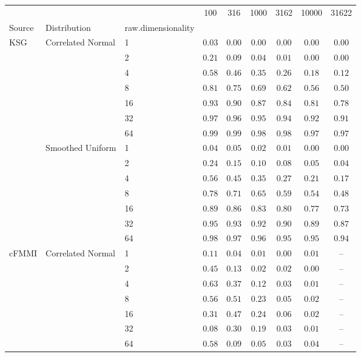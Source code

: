 \begin{tabular}{lllcccccc}
\toprule
 &  &  & 100 & 316 & 1000 & 3162 & 10000 & 31622 \\
Source & Distribution & raw.dimensionality &  &  &  &  &  &  \\
\midrule
\multirow[l]{14}{*}{KSG} & \multirow[l]{7}{*}{Correlated Normal} & 1 & $0.03$ & $0.00$ & $0.00$ & $0.00$ & $0.00$ & $0.00$ \\
 &  & 2 & $0.21$ & $0.09$ & $0.04$ & $0.01$ & $0.00$ & $0.00$ \\
 &  & 4 & $0.58$ & $0.46$ & $0.35$ & $0.26$ & $0.18$ & $0.12$ \\
 &  & 8 & $0.81$ & $0.75$ & $0.69$ & $0.62$ & $0.56$ & $0.50$ \\
 &  & 16 & $0.93$ & $0.90$ & $0.87$ & $0.84$ & $0.81$ & $0.78$ \\
 &  & 32 & $0.97$ & $0.96$ & $0.95$ & $0.94$ & $0.92$ & $0.91$ \\
 &  & 64 & $0.99$ & $0.99$ & $0.98$ & $0.98$ & $0.97$ & $0.97$ \\
\cmidrule{2-9}
 & \multirow[l]{7}{*}{Smoothed Uniform} & 1 & $0.04$ & $0.05$ & $0.02$ & $0.01$ & $0.00$ & $0.00$ \\
 &  & 2 & $0.24$ & $0.15$ & $0.10$ & $0.08$ & $0.05$ & $0.04$ \\
 &  & 4 & $0.56$ & $0.45$ & $0.35$ & $0.27$ & $0.21$ & $0.17$ \\
 &  & 8 & $0.78$ & $0.71$ & $0.65$ & $0.59$ & $0.54$ & $0.48$ \\
 &  & 16 & $0.89$ & $0.86$ & $0.83$ & $0.80$ & $0.77$ & $0.73$ \\
 &  & 32 & $0.95$ & $0.93$ & $0.92$ & $0.90$ & $0.89$ & $0.87$ \\
 &  & 64 & $0.98$ & $0.97$ & $0.96$ & $0.95$ & $0.95$ & $0.94$ \\
\cmidrule{1-9} \cmidrule{2-9}
\multirow[l]{14}{*}{cFMMI} & \multirow[l]{7}{*}{Correlated Normal} & 1 & $0.11$ & $0.04$ & $0.01$ & $0.00$ & $0.01$ & -- \\
 &  & 2 & $0.45$ & $0.13$ & $0.02$ & $0.02$ & $0.00$ & -- \\
 &  & 4 & $0.63$ & $0.37$ & $0.12$ & $0.03$ & $0.01$ & -- \\
 &  & 8 & $0.56$ & $0.51$ & $0.23$ & $0.05$ & $0.02$ & -- \\
 &  & 16 & $0.31$ & $0.47$ & $0.24$ & $0.06$ & $0.02$ & -- \\
 &  & 32 & $0.08$ & $0.30$ & $0.19$ & $0.03$ & $0.01$ & -- \\
 &  & 64 & $0.58$ & $0.09$ & $0.05$ & $0.03$ & $0.04$ & -- \\

\end{tabular}
